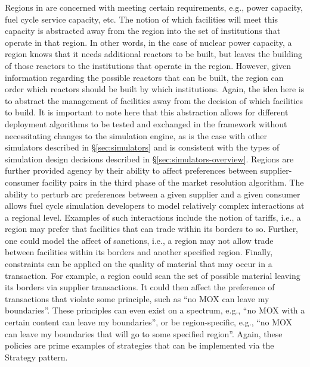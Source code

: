 Regions in \Cyclus are concerned with meeting certain requirements, e.g., power
capacity, fuel cycle service capacity, etc. The notion of which facilities will
meet this capacity is abstracted away from the region into the set of
institutions that operate in that region. In other words, in the case of nuclear
power capacity, a region knows that it needs additional reactors to be built,
but leaves the building of those reactors to the institutions that operate in
the region. However, given information regarding the possible reactors that can
be built, the region can order which reactors should be built by which
institutions. Again, the idea here is to abstract the management of facilities
away from the decision of which facilities to build. It is important to note
here that this abstraction allows for different deployment algorithms to be
tested and exchanged in the \Cyclus framework without necessitating changes to
the simulation engine, as is the case with other simulators described
in \S\ref{sec:simulators} and is consistent with the types of simulation design
decisions described in \S\ref{sec:simulators-overview}. Regions are further
provided agency by their ability to affect preferences between supplier-consumer
facility pairs in the third phase of the market resolution algorithm. The
ability to perturb arc preferences between a given supplier and a given consumer
allows fuel cycle simulation developers to model relatively complex interactions
at a regional level. Examples of such interactions include the notion of
tariffs, i.e., a region may prefer that facilities that can trade within its
borders to so. Further, one could model the affect of sanctions, i.e., a region
may not allow trade between facilities within its borders and another specified
region. Finally, constraints can be applied on the quality of material that may
occur in a transaction. For example, a region could scan the set of possible
material leaving its borders via supplier transactions. It could then affect the
preference of transactions that violate some principle, such as ``no MOX can
leave my boundaries''. These principles can even exist on a spectrum, e.g., ``no
MOX with a certain content can leave my boundaries'', or be region-specific,
e.g., ``no MOX can leave my boundaries that will go to some specified
region''. Again, these policies are prime examples of strategies that can be
implemented via the Strategy pattern.
